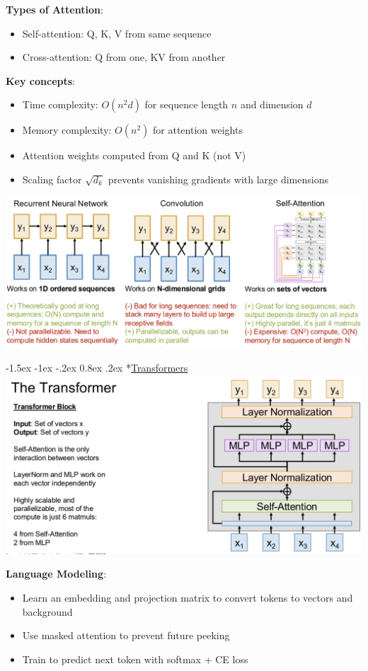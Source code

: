 \documentclass{article}
\makeatletter
\renewcommand\section{\@startsection{section}{1}{\z@}%
                                  {-1.5ex \@plus -1ex \@minus -.2ex}%
                                  {0.8ex \@plus.2ex}%
                                  {\normalfont\small\bfseries}}
\makeatother
\begin{document}
\begin{multicols}{3}
\textbf{Types of Attention}:
\begin{itemize}
\item Self-attention: Q, K, V from same sequence
\item Cross-attention: Q from one, KV from another
\end{itemize}

\textbf{Key concepts}:
\begin{itemize}
\item Time complexity: $O(n^2d)$ for sequence length $n$ and dimension $d$
\item Memory complexity: $O(n^2)$ for attention weights
\item Attention weights computed from Q and K (not V)
\item Scaling factor $\sqrt{d_k}$ prevents vanishing gradients with large dimensions
\end{itemize}

\includegraphics[width=\columnwidth]{imgs/seqs.png}

\section*{\underline{Transformers}}
\includegraphics[width=\columnwidth]{imgs/transformer.png}

\textbf{Language Modeling}:
\begin{itemize}
\item Learn an embedding and projection matrix to convert tokens to vectors and background
\item Use masked attention to prevent future peeking
\item Train to predict next token with softmax + CE loss
\end{itemize}


\end{multicols}
\end{document}
